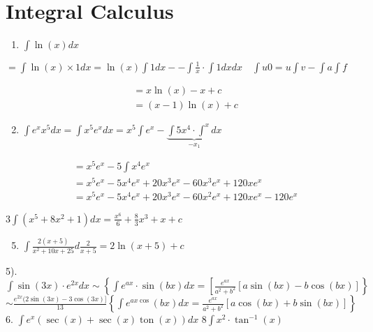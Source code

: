 \documentclass[12pt, a4paper]{article}
\begin{document}
\section*{Integral Calculus}
\begin{enumerate}
  \item $\int \ln (x) d x$
\end{enumerate}

$=\int \ln (x) \times 1 d x=\ln (x) \int 1 d x--\int \frac{1}{x} \cdot \int 1 d x d x \quad \int u 0=u \int v-\int a \int f$

$$
\begin{aligned}
& =x \ln (x)-x+c \\
& =(x-1) \ln (x)+c
\end{aligned}
$$

\begin{enumerate}
  \setcounter{enumi}{1}
  \item $\int e^{x} x^{5} d x=\int x^{5} e^{x} d x=x^{5} \int e^{x}-\underbrace{\int 5 x^{4} \cdot \int^{x} d x}_{-x_{1}}$
\end{enumerate}

$$
\begin{aligned}
& =x^{5} e^{x}-5 \int x^{4} e^{x} \\
& =x^{5} e^{x}-5 x^{4} e^{x}+20 x^{3} e^{x}-60 x^{3} e^{x}+120 x e^{x} \\
& =x^{5} e^{x}-5 x^{4} e^{x}+20 x^{3} e^{x}-60 x^{2} e^{x}+120 x e^{x}-120 e^{x}
\end{aligned}
$$

$3 \int\left(x^{5}+8 x^{2}+1\right) d x=\frac{x^{6}}{6}+\frac{8}{3} x^{3}+x+c$

\begin{enumerate}
  \setcounter{enumi}{4}
  \item $\int \frac{2(x+5)}{x^{2}+10 x+25} d \frac{2}{x+5}=2 \ln (x+5)+c$
\end{enumerate}

5). $\int \sin (3 x) \cdot e^{2 x} d x \sim\left\{\int e^{a x} \cdot \sin (b x) d x=\left[\frac{e^{a x}}{a^{2}+b^{2}}[a \sin (b x)-b \cos (b x)]\right\}\right.$ $\sim \frac{e^{2 x}(2 \sin (3 x)-3 \cos (3 x)]}{13}\left\{\int e^{a x \cos }(b x) d x=\frac{e^{a x}}{a^{2}+b^{2}}[a \cos (b x)+b \sin (b x)]\right\}$ 6. $\int e^{x}(\sec (x)+\sec (x) \operatorname{ton}(x)) d x$ $8 \int x^{2} \cdot \tan ^{-1}(x)$
\end{document}
